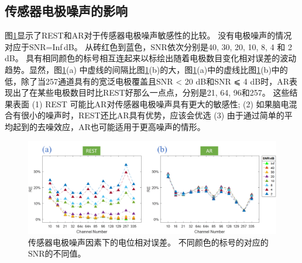 \subsection{传感器电极噪声的影响}
图\ref{2.8}显示了REST和AR对于传感器电极噪声敏感性的比较。 没有电极噪声的情况对应于SNR=Inf$\,$dB。 从砖红色到蓝色，SNR依次分别是40, 30, 20, 10, 8, 4 和 2 dB。 具有相同颜色的标号相互连起来以标绘出随着电极数目变化相对误差的波动趋势。显然，图\ref{2.8}(a) 中虚线的间隔比图\ref{2.8}(b)的大，图\ref{2.8}(a)中的虚线比图\ref{2.8}(b)中的低，除了当257通道具有的宽泛电极覆盖且SNR < 20 dB和SNR ⩽ 4 dB时，AR表现出了在某些电极数目时比REST好那么一点点，分别是21, 64, 96和257。 这些结果表面 (1) REST
可能比AR对传感器电极噪声具有更大的敏感性; (2) 如果脑电混合有很小的噪声时，REST还比AR具有优势，应该会优选 (3) 由于通过简单的平均起到的去噪效应，AR也可能适用于更高噪声的情形。
\begin{figure}[h!]
	\centering
	\includegraphics[width=15cm]{pic/JNE/figure8.png}
	\caption{传感器电极噪声因素下的电位相对误差。 不同颜色的标号的对应的SNR的不同值。}
	\label{2.8}
\end{figure}
